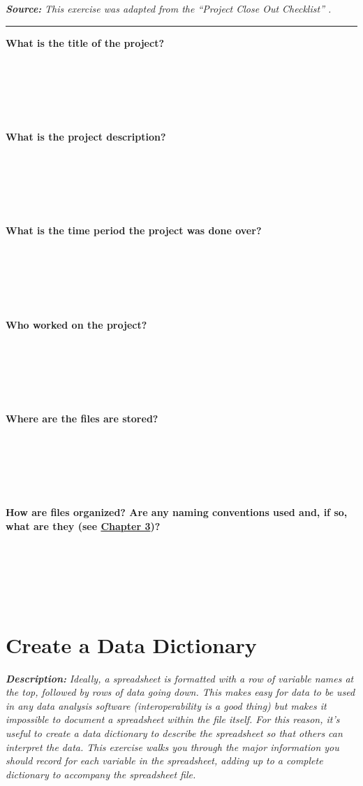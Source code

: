 \documentclass[
]{book}
\begin{document}
\textbf{\emph{Source:}} \emph{This exercise was adapted from the ``Project Close Out Checklist'' \citep{briney_project_2020}.}

\begin{center}\rule{0.5\linewidth}{0.5pt}\end{center}

\textbf{What is the title of the project?}

~

~

~

\textbf{What is the project description?}

~

~

~

\textbf{What is the time period the project was done over?}

~

~

~

\textbf{Who worked on the project?}

~

~

~

\textbf{Where are the files are stored?}

~

~

~

\textbf{How are files organized? Are any naming conventions used and, if so, what are they (see \protect\hyperlink{file-organization-and-naming}{Chapter 3})?}

~

~

~

\hypertarget{data-dictionary}{%
\section{Create a Data Dictionary}\label{data-dictionary}}

\textbf{\emph{Description:}} \emph{Ideally, a spreadsheet is formatted with a row of variable names at the top, followed by rows of data going down. This makes easy for data to be used in any data analysis software (interoperability is a good thing) but makes it impossible to document a spreadsheet within the file itself. For this reason, it's useful to create a data dictionary to describe the spreadsheet so that others can interpret the data. This exercise walks you through the major information you should record for each variable in the spreadsheet, adding up to a complete dictionary to accompany the spreadsheet file.}
\end{document}
